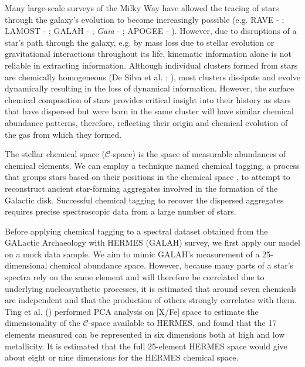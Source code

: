 \documentclass[12pt, letterpaper]{article}
\begin{document}
Many large-scale surveys of the Milky Way have allowed the tracing of stars through the galaxy's evolution to become increasingly possible
(e.g. RAVE - \citeauthor{rave2006} \citeyear{rave2006}; LAMOST - \citeauthor{zhao2012lamost} \citeyear{zhao2012lamost}; GALAH - \citeauthor{desilva2015} \citeyear{desilva2015}; \emph{Gaia} - \citeauthor{refId0} \citeyear{refId0}; APOGEE - \citeauthor{majewski2017} \citeyear{majewski2017}). However, due to disruptions of a star's path through the galaxy, e.g. by mass loss due to stellar evolution or gravitational interactions throughout its life, kinematic information alone is not reliable in extracting information. Although individual clusters formed from stars are chemically homogeneous (De Silva et al. \citeyear{desilva2006,desilva2007}; \citeauthor{bovy2016} \citeyear{bovy2016}), most clusters dissipate and evolve dynamically resulting in the loss of dynamical information. However, the surface chemical composition of stars provides critical insight into their history as stars that have dispersed but were born in the same cluster will have similar chemical abundance patterns, therefore, reflecting their origin and chemical evolution of the gas from which they formed.


The stellar chemical space ($\mathcal{C}$-space) is the space of measurable abundances of chemical elements. We can employ a technique named chemical tagging, a process that groups stars based on their positions in the chemical space \citep{freeman2002}, to attempt to reconstruct ancient star-forming aggregates involved in the formation of the Galactic disk. Successful chemical tagging to recover the dispersed aggregates requires precise spectroscopic data from a large number of stars. 

Before applying chemical tagging to a spectral dataset obtained from the GALactic Archaeology with HERMES (GALAH) survey, we first apply our model on a mock data sample. We aim to mimic GALAH's measurement of a 25-dimensional chemical abundance space. However, because many parts of a star's spectra rely on the same element and will therefore be correlated due to underlying nucleosynthetic processes, it is estimated that around seven chemicals are independent and that the production of others strongly correlates with them. Ting et al. (\citeyear{ting2012}) performed PCA analysis on [X/Fe] space to estimate the dimensionality of the $\mathcal{C}$-space available to HERMES, and found that the 17 elements measured can be represented in six dimensions both at high and low metallicity. It is estimated that the full 25-element HERMES space would give about eight or nine dimensions for the HERMES chemical space.
\end{document}

